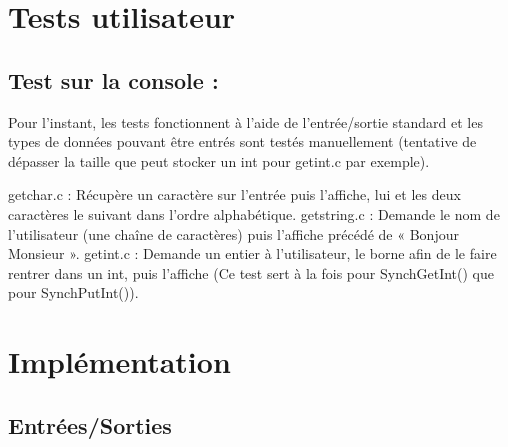 \documentclass[12pt]{report}
\begin{document}
\chapter{Tests utilisateur}
\section{Test sur la console :}
Pour l’instant, les tests fonctionnent à l’aide de l’entrée/sortie standard et les types de données pouvant être entrés sont testés manuellement (tentative de dépasser la taille que peut stocker un int pour getint.c par exemple).

getchar.c : Récupère un caractère sur l’entrée puis l’affiche, lui et les deux caractères le suivant dans l’ordre alphabétique.
getstring.c : Demande le nom de l’utilisateur (une chaîne de caractères) puis l’affiche précédé de « Bonjour Monsieur ».
 getint.c : Demande un entier à l’utilisateur, le borne afin de le faire rentrer dans un int, puis l’affiche (Ce test sert à la fois pour SynchGetInt() que pour SynchPutInt()).

\chapter{Implémentation}

\section{Entrées/Sorties}

%
%
%
%
%
\end{document}
